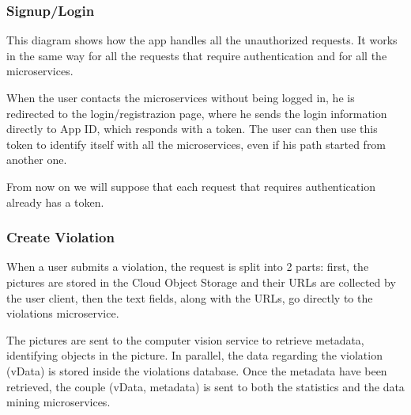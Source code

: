 \subsubsection{Signup/Login}
This diagram shows how the app handles all the unauthorized requests. It works in the same way for all the requests that require authentication and for all the microservices.

When the user contacts the microservices without being logged in, he is redirected to the login/registrazion page, where he sends the login information directly to App ID, which responds with a token. The user can then use this token to identify itself with all the microservices, even if his path started from another one.

From now on we will suppose that each request that requires authentication already has a token.

\subsubsection{Create Violation}
When a user submits a violation, the request is split into 2 parts: first, the pictures are stored in the Cloud Object Storage and their URLs are collected by the user client, then the text fields, along with the URLs, go directly to the violations microservice.

The pictures are sent to the computer vision service to retrieve metadata, identifying objects in the picture. In parallel, the data regarding the violation (vData) is stored inside the violations database. Once the metadata have been retrieved, the couple (vData, metadata) is sent to both the statistics and the data mining microservices.
